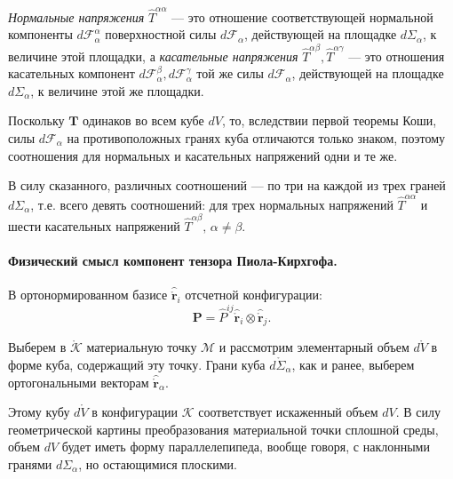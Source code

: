 \textit{Нормальные напряжения} $\widehat{T}^{\alpha \alpha}$ --- это отношение соответствующей нормальной компоненты $d\mathcal{F}^{\alpha}_{\alpha}$
 поверхностной силы $d\mathcal{F}_{\alpha}$, действующей на площадке $d\Sigma_{\alpha}$, к величине этой площадки, а \textit{касательные напряжения} $\widehat{T}^{\alpha \beta}, \widehat{T}^{\alpha \gamma}$ --- это отношения касательных компонент $d\mathcal{F}^{\beta}_{\alpha}, d\mathcal{F}^{\gamma}_{\alpha}$ той же силы $d\mathcal{F}_{\alpha}$, действующей на площадке $d\Sigma_{\alpha}$, к величине этой же площадки.

\begin{remark*}
	Поскольку $\mathbf{T}$ одинаков во всем кубе $dV$, то, вследствии первой теоремы Коши, силы $d\mathcal{F}_{\alpha}$ на противоположных гранях куба отличаются только знаком, поэтому соотношения для нормальных и касательных напряжений одни и те же. 
\end{remark*}

\begin{remark*}
	В силу сказанного, различных соотношений --- по три на каждой из трех граней $d\Sigma_{\alpha}$, т.е. всего девять соотношений: для трех нормальных напряжений $\widehat{T}^{\alpha \alpha}$ и шести касательных напряжений $\widehat{T}^{\alpha \beta}, \, \alpha \not = \beta$. 
\end{remark*}

\paragraph{Физический смысл компонент тензора Пиола-Кирхгофа.}

В ортонормированном базисе $\widehat{\mathring{\mathbf{r}}}_i$ отсчетной конфигурации:
\begin{equation*}
	\mathbf{P} = \widehat{P}^{ij} \widehat{\mathring{\mathbf{r}}}_i \otimes \widehat{\mathring{\mathbf{r}}}_j.
\end{equation*}

Выберем в $\mathring{\mathcal{K}}$ материальную точку $\mathcal{M}$ и рассмотрим элементарный объем $d\mathring{V}$ в форме куба, содержащий эту точку. Грани куба $d\mathring{\Sigma}_{\alpha}$, как и ранее, выберем ортогональными векторам $\widehat{\mathring{\mathbf{r}}}_{\alpha}$.

Этому кубу $d\mathring{V}$ в конфигурации $\mathcal{K}$ соответствует искаженный объем $dV$. В силу геометрической картины преобразования материальной точки сплошной среды, объем $dV$ будет иметь форму параллелепипеда, вообще говоря, с наклонными гранями $d\Sigma_{\alpha}$, но остающимися плоскими.

